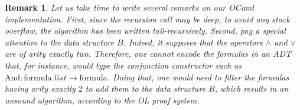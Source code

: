 \documentclass[a4paper, 11pt]{article}
\newtheorem*{remark}{Remark}
\begin{document}
    \begin{remark}
	    Let us take time to write several remarks on our OCaml implementation. First, since the
	    recursion call may be deep, to avoid any
	    stack overflow, the algorithm has been written tail-recursively. Second, pay a special 
	    attention
	    to the data structure $B$. Indeed, it supposes that the operators $\wedge$ and $\vee$ are of
	    arity exactly two. Therefore, one cannot encode the formulas in an ADT that, for instance,
	    would type the conjunction constructor such as 
	    $\text{And}:\text{formula }list\rightarrow\text{formula}$. Doing that, one would need to
	    filter the formulas having arity exactly $2$ to add them to the data structure $B$, which
	    results in an unsound algorithm, according to the OL proof system.
    \end{remark}
\end{document}
